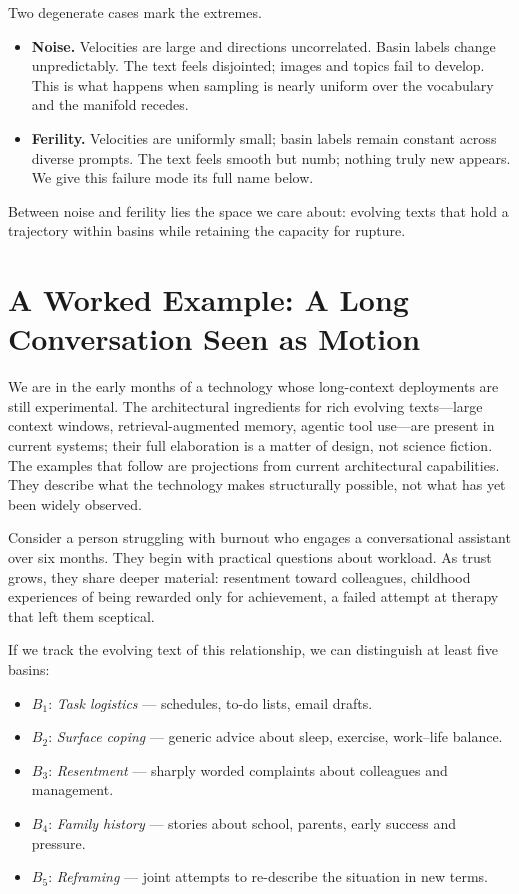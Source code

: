 \documentclass[12pt,a4paper]{article}
\begin{document}
Two degenerate cases mark the extremes.

\begin{itemize}
  \item \textbf{Noise.} Velocities are large and directions uncorrelated. Basin labels change unpredictably. The text feels disjointed; images and topics fail to develop. This is what happens when sampling is nearly uniform over the vocabulary and the manifold recedes.

  \item \textbf{Ferility.} Velocities are uniformly small; basin labels remain constant across diverse prompts. The text feels smooth but numb; nothing truly new appears. We give this failure mode its full name below.
\end{itemize}

Between noise and ferility lies the space we care about: evolving texts that hold a trajectory within basins while retaining the capacity for rupture.

\section{A Worked Example: A Long Conversation Seen as Motion}

We are in the early months of a technology whose long-context deployments are still experimental. The architectural ingredients for rich evolving texts---large context windows, retrieval-augmented memory, agentic tool use---are present in current systems; their full elaboration is a matter of design, not science fiction. The examples that follow are projections from current architectural capabilities. They describe what the technology makes structurally possible, not what has yet been widely observed.

Consider a person struggling with burnout who engages a conversational assistant over six months. They begin with practical questions about workload. As trust grows, they share deeper material: resentment toward colleagues, childhood experiences of being rewarded only for achievement, a failed attempt at therapy that left them sceptical.

If we track the evolving text of this relationship, we can distinguish at least five basins:

\begin{itemize}
  \item $B_1$: \emph{Task logistics} --- schedules, to-do lists, email drafts.
  \item $B_2$: \emph{Surface coping} --- generic advice about sleep, exercise, work--life balance.
  \item $B_3$: \emph{Resentment} --- sharply worded complaints about colleagues and management.
  \item $B_4$: \emph{Family history} --- stories about school, parents, early success and pressure.
  \item $B_5$: \emph{Reframing} --- joint attempts to re-describe the situation in new terms.
\end{itemize}
\end{document}
